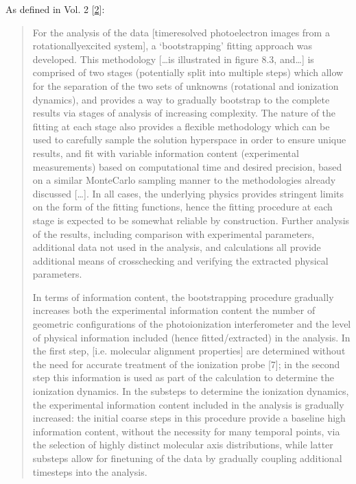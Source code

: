 \documentclass[letterpaper,table,10pt,english]{jupyterBook}
\begin{document}
\sphinxAtStartPar
As defined in  Vol. 2 {[}\hyperlink{cite.backmatter/bibliography:id614}{2}{]}:
\begin{quote}

\sphinxAtStartPar
For the analysis of the data {[}time\sphinxhyphen{}resolved photoelectron images from a rotationally\sphinxhyphen{}excited system{]}, a ‘bootstrapping’ fitting approach was developed. This methodology {[}…is illustrated in figure 8.3, and…{]} is comprised of two stages (potentially split into multiple steps) which allow for the separation of the two sets of unknowns (rotational and ionization dynamics), and provides a way to gradually bootstrap to the complete {\hyperref[\detokenize{backmatter/glossary:term-MF}]{}} results via stages of analysis of increasing complexity. The nature of the fitting at each stage also provides a flexible methodology which can be used to carefully sample the solution hyperspace in order to ensure unique results, and fit with variable information content (experimental measurements) based on computational time and desired precision, based on a similar Monte\sphinxhyphen{}Carlo sampling manner to the methodologies already discussed {[}…{]}. In all cases, the underlying physics provides stringent limits on the form of the fitting functions, hence the fitting procedure at each stage is expected to be somewhat reliable by construction. Further analysis of the results, including comparison with experimental parameters, additional data not used in the analysis, and  calculations all provide additional means of cross\sphinxhyphen{}checking and verifying the extracted physical parameters.

\sphinxAtStartPar
In terms of information content, the bootstrapping procedure gradually increases both the experimental information content \sphinxhyphen{} the number of geometric configurations of the photoionization interferometer \sphinxhyphen{} and the level of physical information included (hence fitted/extracted) in the analysis. In the first step, {\hyperref[\detokenize{backmatter/glossary:term-ADMs}]{}} {[}i.e. molecular alignment properties{]} are determined without the need for accurate treatment of the ionization probe {[}7{]}; in the second step this information is used as part of the calculation to determine the ionization dynamics. In the sub\sphinxhyphen{}steps to determine the ionization dynamics, the experimental information content included in the analysis is gradually increased: the initial coarse steps in this procedure provide a base\sphinxhyphen{}line high information content, without the necessity for many temporal points, via the selection of highly distinct molecular axis distributions, while latter sub\sphinxhyphen{}steps allow for fine\sphinxhyphen{}tuning of the data by gradually coupling additional time\sphinxhyphen{}steps into the analysis.


\end{quote}
\end{document}
